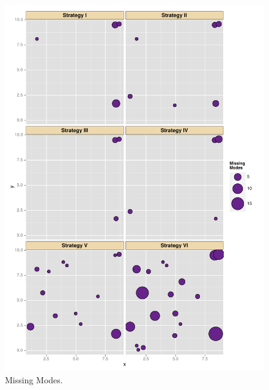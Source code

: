 \documentclass{book}
\begin{document}
\begin{figure}[ht]
	\centering \includegraphics[width=\textwidth,keepaspectratio=TRUE]{./img/ggplotMissingModes.pdf}
	\caption{Missing Modes.}\label{missingModes}
\end{figure}
\end{document}
